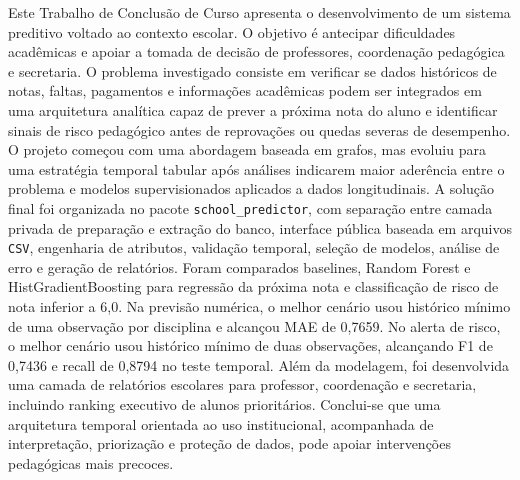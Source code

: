 
\begin{resumo}
Este Trabalho de Conclus\~ao de Curso apresenta o desenvolvimento de um sistema preditivo voltado ao contexto escolar. O objetivo \'e antecipar dificuldades acad\^emicas e apoiar a tomada de decis\~ao de professores, coordena\c{c}\~ao pedag\'ogica e secretaria. O problema investigado consiste em verificar se dados hist\'oricos de notas, faltas, pagamentos e informa\c{c}\~oes acad\^emicas podem ser integrados em uma arquitetura anal\'itica capaz de prever a pr\'oxima nota do aluno e identificar sinais de risco pedag\'ogico antes de reprova\c{c}\~oes ou quedas severas de desempenho. O projeto come\c{c}ou com uma abordagem baseada em grafos, mas evoluiu para uma estrat\'egia temporal tabular ap\'os an\'alises indicarem maior ader\^encia entre o problema e modelos supervisionados aplicados a dados longitudinais. A solu\c{c}\~ao final foi organizada no pacote \texttt{school\_predictor}, com separa\c{c}\~ao entre camada privada de prepara\c{c}\~ao e extra\c{c}\~ao do banco, interface p\'ublica baseada em arquivos \texttt{CSV}, engenharia de atributos, valida\c{c}\~ao temporal, sele\c{c}\~ao de modelos, an\'alise de erro e gera\c{c}\~ao de relat\'orios. Foram comparados baselines, Random Forest e HistGradientBoosting para regress\~ao da pr\'oxima nota e classifica\c{c}\~ao de risco de nota inferior a 6,0. Na previs\~ao num\'erica, o melhor cen\'ario usou hist\'orico m\'inimo de uma observa\c{c}\~ao por disciplina e alcan\c{c}ou MAE de 0,7659. No alerta de risco, o melhor cen\'ario usou hist\'orico m\'inimo de duas observa\c{c}\~oes, alcan\c{c}ando F1 de 0,7436 e recall de 0,8794 no teste temporal. Al\'em da modelagem, foi desenvolvida uma camada de relat\'orios escolares para professor, coordena\c{c}\~ao e secretaria, incluindo ranking executivo de alunos priorit\'arios. Conclui-se que uma arquitetura temporal orientada ao uso institucional, acompanhada de interpreta\c{c}\~ao, prioriza\c{c}\~ao e prote\c{c}\~ao de dados, pode apoiar interven\c{c}\~oes pedag\'ogicas mais precoces.
\end{resumo}
